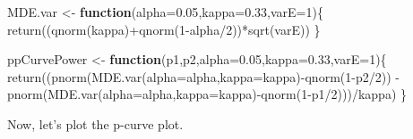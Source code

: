 \documentclass[
]{book}
\newenvironment{Shaded}{\begin{snugshade}}{\end{snugshade}}
\newcommand{\AttributeTok}[1]{\textcolor[rgb]{0.77,0.63,0.00}{#1}}
\newcommand{\ControlFlowTok}[1]{\textcolor[rgb]{0.13,0.29,0.53}{\textbf{#1}}}
\newcommand{\DecValTok}[1]{\textcolor[rgb]{0.00,0.00,0.81}{#1}}
\newcommand{\FloatTok}[1]{\textcolor[rgb]{0.00,0.00,0.81}{#1}}
\newcommand{\FunctionTok}[1]{\textcolor[rgb]{0.00,0.00,0.00}{#1}}
\newcommand{\NormalTok}[1]{#1}
\newcommand{\OtherTok}[1]{\textcolor[rgb]{0.56,0.35,0.01}{#1}}
\newcommand{\SpecialCharTok}[1]{\textcolor[rgb]{0.00,0.00,0.00}{#1}}
\theoremstyle{definition}
\theoremstyle{definition}
\theoremstyle{definition}
\theoremstyle{definition}
\theoremstyle{remark}
\begin{document}
\begin{Shaded}
\begin{Highlighting}[]
\NormalTok{MDE.var }\OtherTok{\textless{}{-}} \ControlFlowTok{function}\NormalTok{(}\AttributeTok{alpha=}\FloatTok{0.05}\NormalTok{,}\AttributeTok{kappa=}\FloatTok{0.33}\NormalTok{,}\AttributeTok{varE=}\DecValTok{1}\NormalTok{)\{}
  \FunctionTok{return}\NormalTok{((}\FunctionTok{qnorm}\NormalTok{(kappa)}\SpecialCharTok{+}\FunctionTok{qnorm}\NormalTok{(}\DecValTok{1}\SpecialCharTok{{-}}\NormalTok{alpha}\SpecialCharTok{/}\DecValTok{2}\NormalTok{))}\SpecialCharTok{*}\FunctionTok{sqrt}\NormalTok{(varE))}
\NormalTok{\}}

\NormalTok{ppCurvePower }\OtherTok{\textless{}{-}} \ControlFlowTok{function}\NormalTok{(p1,p2,}\AttributeTok{alpha=}\FloatTok{0.05}\NormalTok{,}\AttributeTok{kappa=}\FloatTok{0.33}\NormalTok{,}\AttributeTok{varE=}\DecValTok{1}\NormalTok{)\{}
  \FunctionTok{return}\NormalTok{((}\FunctionTok{pnorm}\NormalTok{(}\FunctionTok{MDE.var}\NormalTok{(}\AttributeTok{alpha=}\NormalTok{alpha,}\AttributeTok{kappa=}\NormalTok{kappa)}\SpecialCharTok{{-}}\FunctionTok{qnorm}\NormalTok{(}\DecValTok{1}\SpecialCharTok{{-}}\NormalTok{p2}\SpecialCharTok{/}\DecValTok{2}\NormalTok{))}
          \SpecialCharTok{{-}}\FunctionTok{pnorm}\NormalTok{(}\FunctionTok{MDE.var}\NormalTok{(}\AttributeTok{alpha=}\NormalTok{alpha,}\AttributeTok{kappa=}\NormalTok{kappa)}\SpecialCharTok{{-}}\FunctionTok{qnorm}\NormalTok{(}\DecValTok{1}\SpecialCharTok{{-}}\NormalTok{p1}\SpecialCharTok{/}\DecValTok{2}\NormalTok{)))}\SpecialCharTok{/}\NormalTok{kappa)}
\NormalTok{\}}
\end{Highlighting}
\end{Shaded}

Now, let's plot the p-curve plot.
\end{document}

